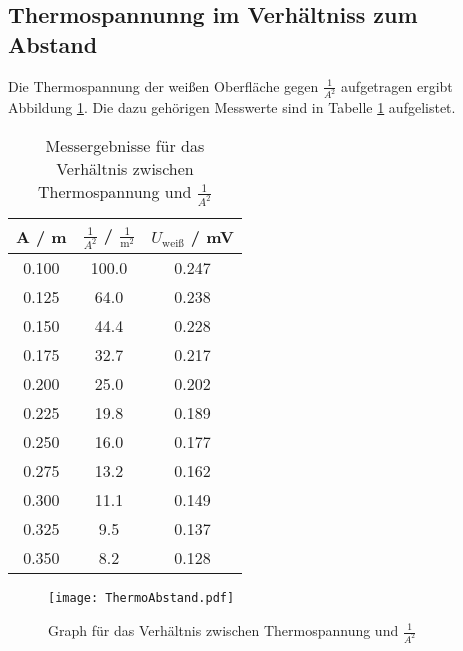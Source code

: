\subsection{Thermospannunng im Verhältniss zum Abstand}
Die Thermospannung der weißen Oberfläche gegen $\frac{1}{A^2}$ aufgetragen ergibt Abbildung \ref{fig:Abstand}. Die dazu gehörigen Messwerte sind in Tabelle \ref{tab:Abstand} aufgelistet.
\begin{table}[H]
  \centering
  \begin{tabular}{c c c}
      A / m & $\frac{1}{A^2}$ / $\frac{1}{\text{m}^2}$ & $U_\text{weiß}$ / mV \\
    \midrule
      0.100  & 100.0 & 0.247 \\
      0.125	& 64.0   & 0.238 \\
      0.150	& 44.4   & 0.228 \\
      0.175	& 32.7   & 0.217 \\
      0.200	& 25.0   & 0.202 \\
      0.225	& 19.8   & 0.189 \\
      0.250	& 16.0   & 0.177 \\
      0.275	& 13.2   & 0.162 \\
      0.300	& 11.1   & 0.149 \\
      0.325	& 9.5    & 0.137 \\
      0.350	& 8.2    & 0.128 \\
  \end{tabular}
  \caption{Messergebnisse für das Verhältnis zwischen Thermospannung und $\frac{1}{A^2}$}
  \label{tab:Abstand}
\end{table}

\begin{figure}
  \centering
  \texttt{[image: ThermoAbstand.pdf]}
  \caption{Graph für das Verhältnis zwischen Thermospannung und $\frac{1}{A^2}$}
  \label{fig:Abstand}
\end{figure}

\newpage
